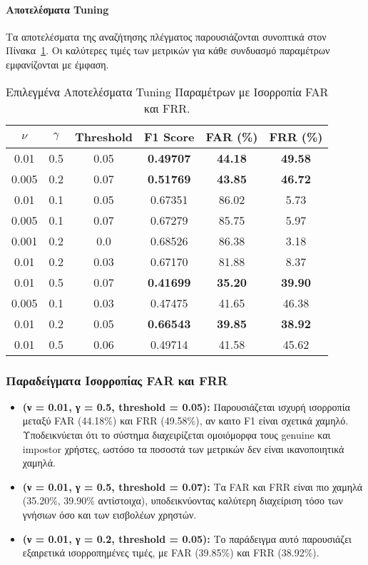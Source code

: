 \paragraph{Αποτελέσματα Tuning}
Τα αποτελέσματα της αναζήτησης πλέγματος παρουσιάζονται συνοπτικά στον Πίνακα~\ref{tab:balanced_results}. Οι καλύτερες τιμές των μετρικών για κάθε συνδυασμό παραμέτρων εμφανίζονται με έμφαση.

\begin{table}[H]
\centering
\begin{tabular}{|c|c|c|c|c|c|}
\hline
\textbf{$\nu$} & \textbf{$\gamma$} & \textbf{Threshold} & \textbf{F1 Score} & \textbf{FAR (\%)} & \textbf{FRR (\%)} \\ \hline
0.01 & 0.5 & 0.05 & \textbf{0.49707} & \textbf{44.18} & \textbf{49.58} \\ \hline
0.005 & 0.2 & 0.07 & \textbf{0.51769} & \textbf{43.85} & \textbf{46.72} \\ \hline
0.01 & 0.1 & 0.05 & 0.67351 & 86.02 & 5.73 \\ \hline
0.005 & 0.1 & 0.07 & 0.67279 & 85.75 & 5.97 \\ \hline
0.001 & 0.2 & 0.0 & 0.68526 & 86.38 & 3.18 \\ \hline
0.01 & 0.2 & 0.03 & 0.67170 & 81.88 & 8.37 \\ \hline
0.01 & 0.5 & 0.07 & \textbf{0.41699} & \textbf{35.20} & \textbf{39.90} \\ \hline
0.005 & 0.1 & 0.03 & 0.47475 & 41.65 & 46.38 \\ \hline
0.01 & 0.2 & 0.05 & \textbf{0.66543} & \textbf{39.85} & \textbf{38.92} \\ \hline
0.01 & 0.5 & 0.06 & 0.49714 & 41.58 & 45.62 \\ \hline
\end{tabular}
\caption{Επιλεγμένα Αποτελέσματα Tuning Παραμέτρων με Ισορροπία FAR και FRR.}
\label{tab:balanced_results}
\end{table}

\subsubsection{Παραδείγματα Ισορροπίας FAR και FRR}
\begin{itemize}
    \item \textbf{(ν = 0.01, γ = 0.5, threshold = 0.05):} 
    Παρουσιάζεται ισχυρή ισορροπία μεταξύ FAR (44.18\%) και FRR (49.58\%), αν καιτο F1 είναι σχετικά χαμηλό. Υποδεικνύεται ότι το σύστημα διαχειρίζεται ομοιόμορφα τους genuine και impostor χρήστες, ωστόσο τα ποσοστά των μετρικών δεν είναι ικανοποιητικά χαμηλά.
    
    \item \textbf{(ν = 0.01, γ = 0.5, threshold = 0.07):}
    Τα FAR και FRR είναι πιο χαμηλά (35.20\%, 39.90\% αντίστοιχα), υποδεικνύοντας καλύτερη διαχείριση τόσο των γνήσιων όσο και των εισβολέων χρηστών.

    \item \textbf{(ν = 0.01, γ = 0.2, threshold = 0.05):}
    Το παράδειγμα αυτό παρουσιάζει εξαιρετικά ισορροπημένες τιμές, με FAR (39.85\%) και FRR (38.92\%).
\end{itemize}

